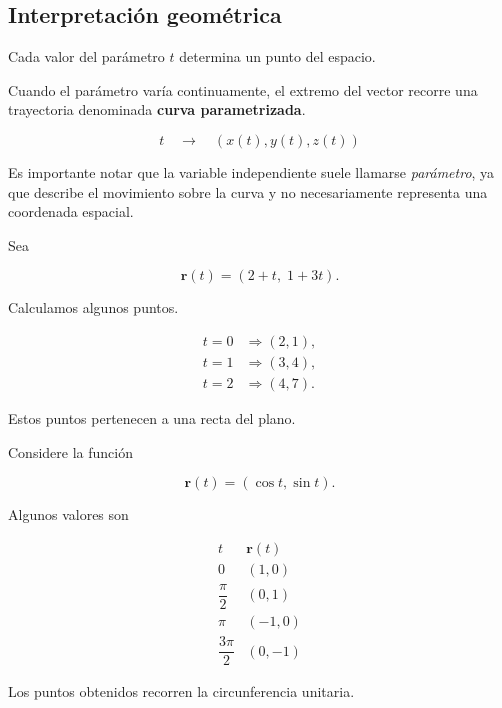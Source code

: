 \newpage

\subsection{Interpretación geométrica}

Cada valor del parámetro $t$ determina un punto del espacio.

Cuando el parámetro varía continuamente, el extremo del vector recorre una trayectoria denominada \textbf{curva parametrizada}.

\[
t
\quad\longrightarrow\quad
(x(t),y(t),z(t))
\]

Es importante notar que la variable independiente suele llamarse \emph{parámetro}, ya que describe el movimiento sobre la curva y no necesariamente representa una coordenada espacial.

\begin{ejemplo}[Recta]
Sea

\[
\mathbf{r}(t)=\left(2+t,\;1+3t\right).
\]

Calculamos algunos puntos.

\[
\begin{aligned}
t=0&\Rightarrow (2,1),\\
t=1&\Rightarrow (3,4),\\
t=2&\Rightarrow (4,7).
\end{aligned}
\]

Estos puntos pertenecen a una recta del plano.
\end{ejemplo}


\begin{ejemplo}[Circunferencia]

Considere la función

\[
\mathbf{r}(t)=\left(\cos t,\sin t\right).
\]

Algunos valores son

\[
\begin{array}{c|c}
t & \mathbf{r}(t)\\
\hline
0&(1,0)\\
\dfrac{\pi}{2}&(0,1)\\
\pi&(-1,0)\\
\dfrac{3\pi}{2}&(0,-1)
\end{array}
\]

Los puntos obtenidos recorren la circunferencia unitaria.
\end{ejemplo}

\newpage

